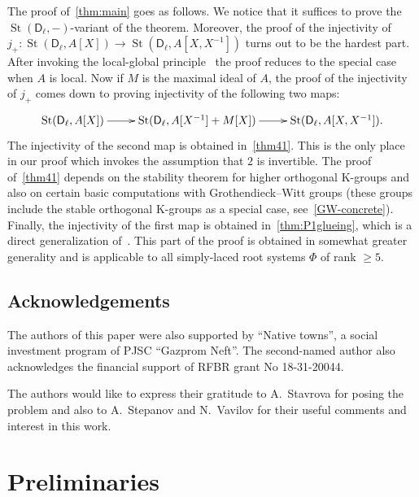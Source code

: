\documentclass[oneside, 8pt]{amsart}
\theoremstyle{remark}
\theoremstyle{definition}
\numberwithin{lemma}{section}
\numberwithin{prop}{section}
\numberwithin{corollary}{section}
\numberwithin{externaltheorem}{section}
\DeclareMathOperator{\St}{St}
\newcommand{\inv}{^{-1}}
\newcommand{\rD}{\mathsf{D}}
\newcommand{\rE}{\mathsf{E}}
\numberwithin{equation}{section}
\begin{document}
The proof of~\cref{thm:main} goes as follows. We notice that it suffices to prove the $\St(\rD_\ell, -)$-variant of the theorem. Moreover, the proof of the injectivity of
$j_+ \colon \St(\rD_\ell, A[X]) \to \St(\rD_\ell, A[X, X\inv])$ turns out to be the hardest part. After invoking the local-global principle~\cite[Theorem~2]{LS17} the proof reduces to the special case when $A$ is local.
Now if $M$ is the maximal ideal of $A$, the proof of the injectivity of $j_+$ comes down to proving injectivity of the following two maps:
\[ \xymatrix{ \St(\rD_\ell, A[X]) \ar[r] & \St(\rD_\ell, A[X\inv] + M[X]) \ar[r] & \St(\rD_\ell, A[X, X\inv]). }\]
The injectivity of the second map is obtained in~\cref{thm41}. This is the only place in our proof which invokes the assumption that $2$ is invertible. The proof of~\cref{thm41} depends on the stability theorem for higher orthogonal K-groups and also on certain basic computations with Grothendieck--Witt groups (these groups include the stable orthogonal K-groups as a special case, see~\eqref{GW-concrete}). Finally, the injectivity of the first map is obtained in~\cref{thm:P1glueing}, which is a direct generalization of~\cite[Proposition~4.3]{Tu83}. This part of the proof is obtained in somewhat greater generality and is applicable to all simply-laced root systems $\Phi$ of rank $\geq 5$.

\subsection{Acknowledgements} 
The authors of this paper were also supported by ``Native towns'', a social investment program of PJSC ``Gazprom Neft''.
The second-named author also acknowledges the financial support of RFBR grant No 18-31-20044.

The authors would like to express their gratitude to A.~Stavrova for posing the problem and also to A.~Stepanov and N.~Vavilov for their useful comments and interest in this work.

\section{Preliminaries}
\end{document}
